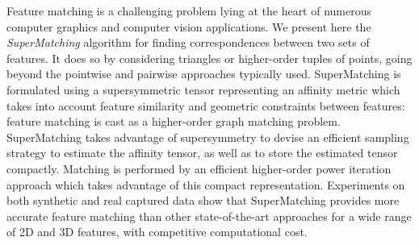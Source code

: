 Feature matching is a challenging problem lying at the heart of numerous computer graphics and computer vision applications.
We present here the \emph{SuperMatching} algorithm for finding correspondences between two sets of features.
It does so by considering triangles or higher-order tuples of points, going beyond the pointwise and pairwise approaches typically used.
SuperMatching is formulated using a supersymmetric tensor representing an affinity metric which takes into account feature similarity and geometric constraints between features:
feature matching is cast as a higher-order graph matching problem.
SuperMatching takes advantage of supersymmetry to devise an
efficient sampling strategy to estimate the affinity tensor, as well as to store the estimated tensor compactly.
Matching is performed by an efficient higher-order power iteration approach which takes advantage of this compact representation.
Experiments on both synthetic and real captured data show that
SuperMatching provides more accurate feature matching than other state-of-the-art approaches for a wide range of 2D and 3D features, with competitive computational cost. 